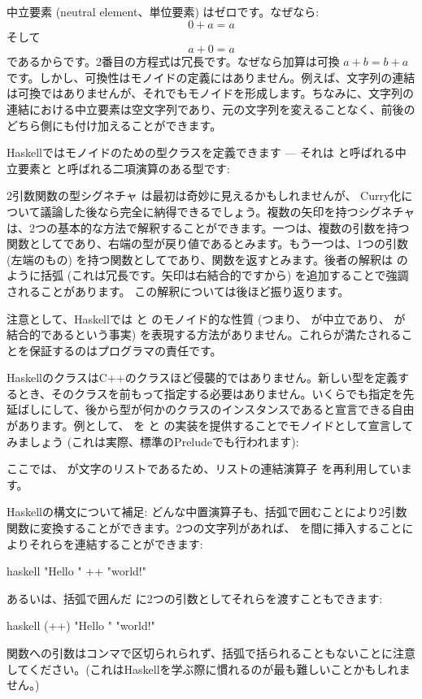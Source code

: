 中立要素 (neutral element、単位要素) はゼロです。なぜなら: 
\[0 + a = a\]
そして
\[a + 0 = a\]
であるからです。2番目の方程式は冗長です。なぜなら加算は可換 \(a + b = b + a\) です。しかし、可換性はモノイドの定義にはありません。例えば、文字列の連結は可換ではありませんが、それでもモノイドを形成します。ちなみに、文字列の連結における中立要素は空文字列であり、元の文字列を変えることなく、前後のどちら側にも付け加えることができます。

Haskellではモノイドのための型クラスを定義できます --- それは  と呼ばれる中立要素と  と呼ばれる二項演算のある型です:

2引数関数の型シグネチャ  は最初は奇妙に見えるかもしれませんが、
Curry化について議論した後なら完全に納得できるでしょう。複数の矢印を持つシグネチャは、2つの基本的な方法で解釈することができます。一つは、複数の引数を持つ関数としてであり、右端の型が戻り値であるとみます。もう一つは、1つの引数 (左端のもの) を持つ関数としてであり、関数を返すとみます。後者の解釈は  のように括弧 (これは冗長です。矢印は右結合的ですから) を追加することで強調されることがあります。
この解釈については後ほど振り返ります。

注意として、Haskellでは  と  のモノイド的な性質 (つまり、 が中立であり、 が結合的であるという事実) を表現する方法がありません。これらが満たされることを保証するのはプログラマの責任です。

HaskellのクラスはC++のクラスほど侵襲的ではありません。新しい型を定義するとき、そのクラスを前もって指定する必要はありません。いくらでも指定を先延ばしにして、後から型が何かのクラスのインスタンスであると宣言できる自由があります。例として、 を  と  の実装を提供することでモノイドとして宣言してみましょう (これは実際、標準のPreludeでも行われます): 

ここでは、 が文字のリストであるため、リストの連結演算子 \code{(++)} を再利用しています。

Haskellの構文について補足: どんな中置演算子も、括弧で囲むことにより2引数関数に変換することができます。2つの文字列があれば、\code{++} を間に挿入することによりそれらを連結することができます: 

\begin{snip}{haskell}
"Hello " ++ "world!"
\end{snip}
あるいは、括弧で囲んだ \code{(++)} に2つの引数としてそれらを渡すこともできます: 

\begin{snip}{haskell}
(++) "Hello " "world!"
\end{snip}
関数への引数はコンマで区切られられず、括弧で括られることもないことに注意してください。(これはHaskellを学ぶ際に慣れるのが最も難しいことかもしれません。) 

